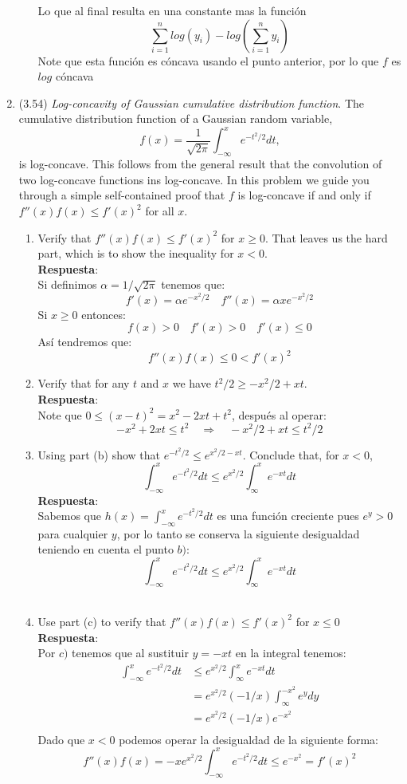 \documentclass[12pt, oneside]{article}%
\begin{document}
\begin{enumerate}
\begin{enumerate}
    Lo que al final resulta en una constante mas la función $$\sum_{i=1}^n log(y_i) - log \left(\sum_{i=1}^n y_i \right)$$
    Note que esta función es cóncava usando el punto anterior, por lo que $f$ es $log$ cóncava
\end{enumerate}
\item (3.54) \textit{Log-concavity of Gaussian cumulative distribution function}. The cumulative distribution function of a Gaussian random variable,
$$f(x) = \frac{1}{\sqrt{2\pi}}\int_{-\infty}^x e^{-t^2/2}dt,$$
is log-concave. This follows from the general result that the convolution of two log-concave functions ins log-concave. In this problem we guide you through a simple self-contained proof that $f$ is log-concave if and only if $f''(x) f(x) \leq f'(x)^2$ for all $x$.
\begin{enumerate}
    \item Verify that $f''(x) f(x) \leq f'(x)^2$ for $x \geq 0$. That leaves us the hard part, which is to show the inequality for $x < 0$. \\ 
    \textbf{Respuesta}: \\
    Si definimos $\alpha=1/\sqrt{2\pi}$ tenemos que:
    $$f'(x)=\alpha e^{-x^2/2}\quad f''(x)=\alpha x e^{-x^2/2}$$
    Si $x\geq0$ entonces:
    $$f(x)>0\quad f'(x)>0 \quad f'(x)\leq0$$
    Así tendremos que:
    $$f''(x) f(x) \leq 0 < f'(x)^2$$
    \item Verify that for any $t$ and $x$ we have $t^2/2 \geq -x^2/2 + xt$. \\
    \textbf{Respuesta}: \\
    Note que $0\leq (x-t)^2=x^2-2xt +t^2$, después al operar:
    $$-x^2+2xt\leq t^2 \quad \Rightarrow\quad -x^2/2+xt\leq t^2/2$$
    \item Using part (b) show that $e^{-t^2/2} \leq e^{x^2/2 - xt}$. Conclude that, for $x < 0$,
    $$\int_{-\infty}^x e^{-t^2/2}dt \leq e^{x^2/2}\int_{\infty}^x e^{-xt} dt$$
    \textbf{Respuesta}: \\
    Sabemos que $h(x)=\int_{-\infty}^x e^{-t^2/2} dt$ es una función creciente pues $e^y>0$ para cualquier $y$, por lo tanto se conserva la siguiente desigualdad teniendo en cuenta el punto $b)$:
    $$\int_{-\infty}^x e^{-t^2/2}dt \leq e^{x^2/2}\int_{\infty}^x e^{-xt} dt$$\\
    \item Use part (c) to verify that $f''(x)f(x) \leq f'(x)^2 $ for $x \leq 0$\\
    \textbf{Respuesta}: \\
    Por $c)$ tenemos que al sustituir $y=-xt$ en la integral tenemos:
    \begin{align*}
        \int_{-\infty}^x e^{-t^2/2}dt &\leq e^{x^2/2}\int_{\infty}^x e^{-xt} dt\\
        &= e^{x^2/2} (-1/x)\int_{\infty}^{-x^2} e^y dy\\
        &= e^{x^2/2} (-1/x) e^{-x^2}\\
    \end{align*}
    Dado que $x<0$ podemos operar la desigualdad de la siguiente forma:
    $$f''(x) f(x) =-xe^{x^2/2}\int_{-\infty}^x e^{-t^2/2}dt\leq e^{-x^2}=f'(x)^2$$
\end{enumerate}
\end{enumerate}
\end{document}
